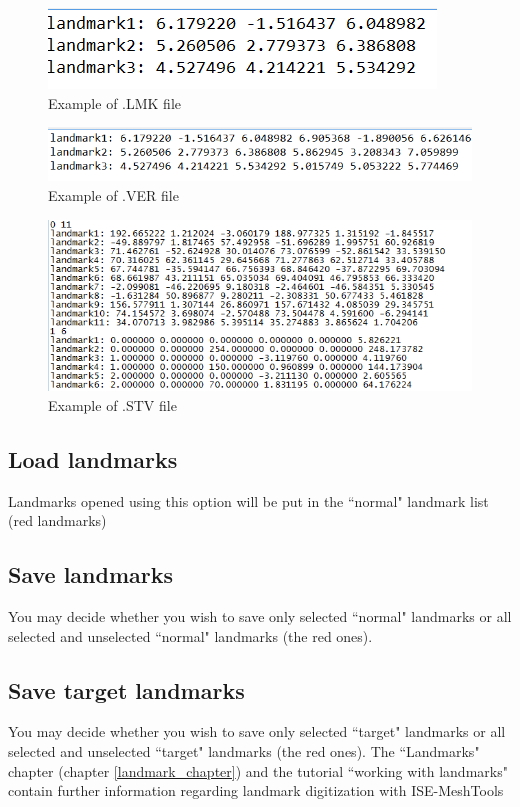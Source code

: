 \begin{figure}
  \centering
  \includegraphics[scale=0.5]{images/Landmarks/LMK_file.png}
 \caption{Example of .LMK file}
\label{LMK_file}
\end{figure}

\begin{figure}
  \centering
  \includegraphics[scale=0.5]{images/Landmarks/VER_file.png}
 \caption{Example of .VER file}
\label{VER_file}
\end{figure}
\begin{figure}
  \centering
  \includegraphics[scale=0.5]{images/Landmarks/STV_file.png}
 \caption{Example of .STV file}
\label{STV_file}
\end{figure}

\subsection{Load landmarks}
Landmarks opened using this option will be put in the ``normal" landmark list (red landmarks)
\subsection{Save landmarks}
You may decide whether you wish to save only selected ``normal" landmarks or all selected and
unselected ``normal" landmarks (the red ones).
\subsection{Save target landmarks}
You may decide whether you wish to save only selected ``target" landmarks or all selected and
unselected ``target" landmarks (the red ones).
The ``Landmarks" chapter (chapter \ref{landmark_chapter}) and the tutorial ``working with landmarks" contain further information regarding landmark digitization with ISE-MeshTools
